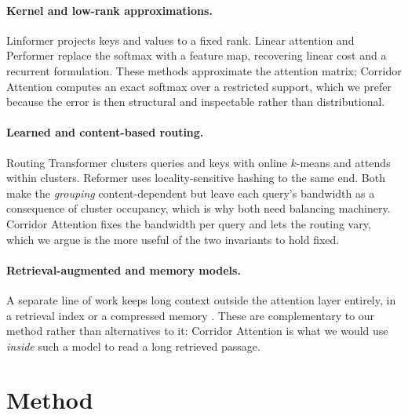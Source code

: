 \documentclass[11pt]{article}
\begin{document}
\paragraph{Kernel and low-rank approximations.} Linformer
\citep{wang2020linformer} projects keys and values to a fixed rank. Linear
attention \citep{katharopoulos2020linear} and Performer
\citep{choromanski2021performer} replace the softmax with a feature map,
recovering linear cost and a recurrent formulation. These methods approximate
the attention matrix; Corridor Attention computes an exact softmax over a
restricted support, which we prefer because the error is then structural and
inspectable rather than distributional.

\paragraph{Learned and content-based routing.} Routing Transformer
\citep{roy2021efficient} clusters queries and keys with online $k$-means and
attends within clusters. Reformer \citep{kitaev2020reformer} uses
locality-sensitive hashing to the same end. Both make the \emph{grouping}
content-dependent but leave each query's bandwidth as a consequence of cluster
occupancy, which is why both need balancing machinery. Corridor Attention fixes
the bandwidth per query and lets the routing vary, which we argue is the more
useful of the two invariants to hold fixed.

\paragraph{Retrieval-augmented and memory models.} A separate line of work
keeps long context outside the attention layer entirely, in a retrieval index
or a compressed memory \citep{rae2020compressive,borgeaud2022improving}. These
are complementary to our method rather than alternatives to it: Corridor
Attention is what we would use \emph{inside} such a model to read a long
retrieved passage.

\section{Method}\label{sec:method}

\end{document}
